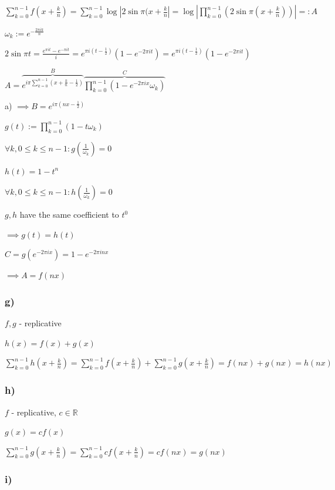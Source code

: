 \documentclass{article}
\begin{document}
\( \sum_{k=0}^{n-1} f(x+\frac{k}{n}) = \sum_{k=0}^{n-1} \log |2 \sin \pi (x + \frac{k}{n}| = \log |\prod_{k=0}^{n-1}(2\sin \pi (x + \frac{k}{n}))| =: A \)

\( \omega_k := e^{-\frac{2\pi i k}{n}} \)

\( 2\sin \pi t = \frac{e^{\pi i t}-e^{-\pi i t}}{i} = e^{\pi i (t - \frac{1}{2})}(1-e^{-2\pi i t}) = e^{\pi i (t - \frac{1}{2})}(1-e^{-2\pi i t}) \)

\( A = \overbrace{e^{i \pi \sum_{k=0}^{n-1}(x+\frac{k}{n}-\frac{1}{2})}}^B \overbrace{\prod_{k=0}^{n-1} (1-e^{-2\pi i x}\omega_k)}^C \)

a) \( \implies B = e^{i \pi (nx - \frac{1}{2})} \)

\( g(t) := \prod_{k=0}^{n-1} (1-t\omega_k) \)

\( \forall k, 0 \leq k \leq n - 1: g(\frac{1}{\omega_k}) = 0 \)

\( h(t) = 1-t^n \)

\( \forall k, 0 \leq k \leq n - 1: h(\frac{1}{\omega_k}) = 0 \)

\( g, h \) have the same coefficient to \( t^0 \)

\( \implies g(t) = h(t) \)

\( C = g(e^{-2\pi i x}) = 1 - e^{-2\pi i n x} \)

\( \implies A = f(nx) \)

\subsubsection*{g)}

\( f, g \) - replicative

\( h(x) = f(x) + g(x) \)

\( \sum_{k=0}^{n-1} h(x+\frac{k}{n}) = \sum_{k=0}^{n-1} f(x+\frac{k}{n}) + \sum_{k=0}^{n-1} g(x+\frac{k}{n}) = f(nx) + g(nx) = h(nx) \)

\subsubsection*{h)}

\( f \) - replicative, \( c \in \mathbb{R} \)

\( g(x) = cf(x) \)

\( \sum_{k=0}^{n-1} g(x+\frac{k}{n}) = \sum_{k=0}^{n-1} cf(x+\frac{k}{n}) = cf(nx) = g(nx) \)

\subsubsection*{i)}
\end{document}
